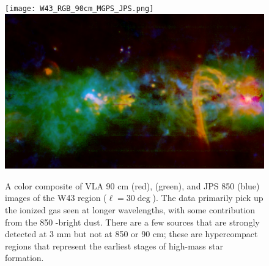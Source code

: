 \documentclass[11pt,preprint]{aastex_nofoot}
\begin{document}

\begin{figure}
\texttt{[image: W43\_RGB\_90cm\_MGPS\_JPS.png]}
\includegraphics[width=18cm]{SgrB2_RGB_20cm_MGPSplanck_ATLASGAL.png}
\caption{
A color composite of VLA 90 cm (red), \MUSTANG (green), and JPS 850 \um (blue)
images of the W43 region ($\ell=30\deg$).  The \MUSTANG data primarily pick up
the ionized gas seen at longer wavelengths, with some contribution from the 
850 \um-bright dust.  There are a few sources that are strongly detected at 3 mm
but not at 850 \um or 90 cm; these are hypercompact \hii regions that represent
the earliest stages of high-mass star formation.
}
\label{fig:figure}
\end{figure}
\end{document}
